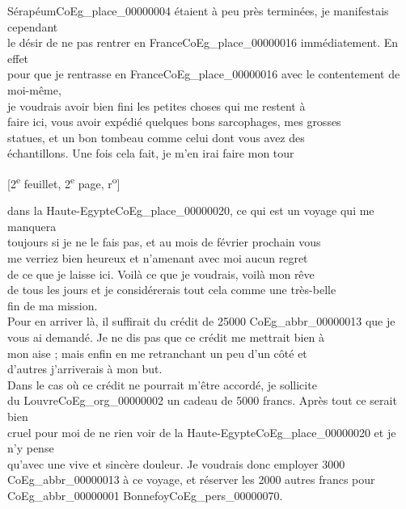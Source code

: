 \documentclass{book}
\begin{document}
Sérapéum\gls{CoEg_place_00000004} étaient à peu près terminées, je manifestais cependant\\
le désir de ne pas rentrer en France\gls{CoEg_place_00000016} immédiatement. En effet\\
pour que je rentrasse en France\gls{CoEg_place_00000016} avec le contentement de moi-même,\\
je voudrais avoir bien fini les petites choses qui me restent à\\
faire ici, vous avoir expédié quelques bons sarcophages, mes grosses\\
statues, et un bon tombeau comme celui dont vous avez des\\
échantillons. Une fois cela fait, je m’en irai faire mon tour
{\footnotesize\begin{center} {[2\textsuperscript{e} feuillet, 2\textsuperscript{e} page, r\textsuperscript{o}]}\end{center}}
\noindent dans la Haute-Egypte\gls{CoEg_place_00000020}, ce qui est un voyage qui me manquera\\
toujours si je ne le fais pas, et au mois de février prochain vous\\
me verriez bien heureux et n’amenant avec moi aucun regret\\
de ce que je laisse ici. Voilà ce que je voudrais, voilà mon rêve\\
de tous les jours et je considérerais tout cela comme une très-belle\\
fin de ma mission.\\
\indent Pour en arriver là, il suffirait du crédit de 25000 \gls{CoEg_abbr_00000013} que je\\
vous ai demandé. Je ne dis pas que ce crédit me mettrait bien à\\
mon aise ; mais enfin en me retranchant un peu d’un côté et\\
d’autres j’arriverais à mon but.\\
\indent Dans le cas où ce crédit ne pourrait m’être accordé, je sollicite\\
du Louvre\gls{CoEg_org_00000002} un cadeau de 5000 francs. Après tout ce serait bien\\
cruel pour moi de ne rien voir de la Haute-Egypte\gls{CoEg_place_00000020} et je n’y pense\\
qu’avec une vive et sincère douleur. Je voudrais donc employer 3000\\
\gls{CoEg_abbr_00000013} à ce voyage, et réserver les 2000 autres francs pour \gls{CoEg_abbr_00000001} Bonnefoy\gls{CoEg_pers_00000070}.\\
\end{document}
